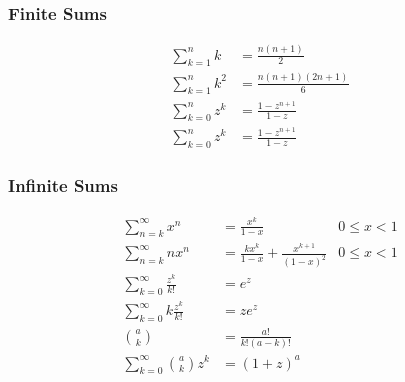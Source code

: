 
\subsubsection{Finite Sums}
\begin{equation*} \begin{split}
	\sum_{k=1}^n k   &= \frac{n(n+1)}{2} \\
	\sum_{k=1}^n k^2 &= \frac{n(n+1)(2n+1)}{6} \\
	\sum_{k=0}^n z^k &= \frac{1-z^{n+1}}{1-z} \\
	\sum_{k=0}^n z^k &= \frac{1-z^{n+1}}{1-z}
\end{split} \end{equation*}


\subsubsection{Infinite Sums}
\begin{align*}
	\sum_{n=k}^\infty x^n  &= \frac{x^k}{1-x}    &  0 \le x < 1 \\
	\sum_{n=k}^\infty nx^n &= \frac{kx^k}{1-x} + \frac{x^{k+1}}{(1-x)^2}  &  0 \le x < 1 \\
	\sum_{k=0}^\infty \frac{z^k}{k!} & = e^z  & \\
	\sum_{k=0}^\infty k \frac{z^k}{k!} & = ze^z & \\
	{a \choose k} &= \frac{a!}{k!(a-k)!} & \\
	\sum_{k=0}^\infty  {a \choose k} z^k &= (1+z)^a &
\end{align*}
